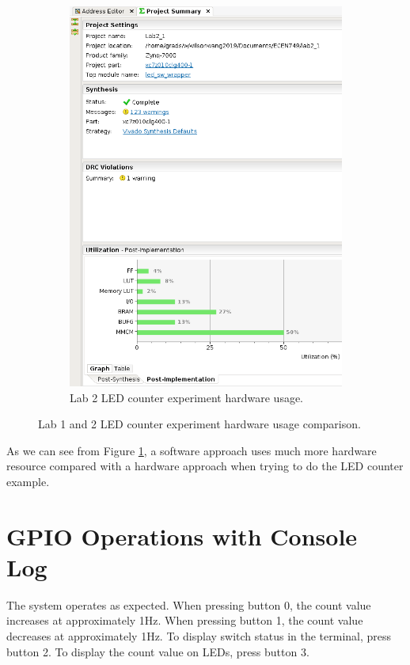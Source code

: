 \documentclass[11pt,letterpaper,titlepage]{article}
\begin{document}
\begin{figure}[h!]
\begin{subfigure}{0.49\textwidth}
        \includegraphics[width=\linewidth]{Lab2_Hardware_Usage.png}
        \caption{Lab 2 LED counter experiment hardware usage.}
    \end{subfigure}
    \caption{Lab 1 and 2 LED counter experiment hardware usage comparison.}
    \label{hardware_comparison}
\end{figure}

As we can see from Figure \ref{hardware_comparison}, a software approach uses much more hardware resource compared with a hardware approach when trying to do the LED counter example.

\newpage

\section{GPIO Operations with Console Log}

The system operates as expected. When pressing button 0, the count value increases at approximately 1Hz. When pressing button 1, the count value decreases at approximately 1Hz. To display switch status in the terminal, press button 2. To display the count value on LEDs, press button 3.
\end{document}
